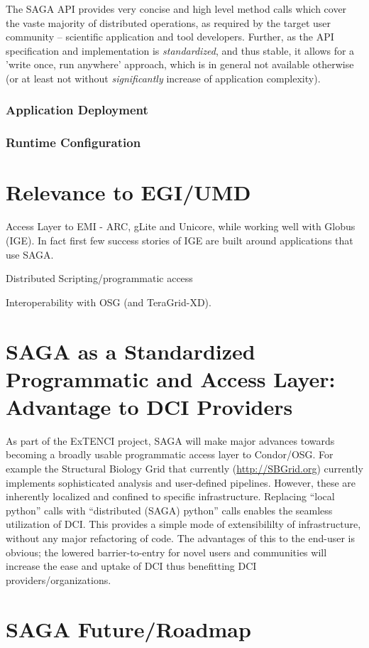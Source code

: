 \documentclass[12pt]{article}
\newcommand{\I}[1]{\textit{#1}}
\begin{document}
  The SAGA API provides very concise and high level method calls which
  cover the vaste majority of distributed operations, as required by
  the target user community -- scientific application and tool
  developers.  Further, as the API specification and implementation is
  \I{standardized}, and thus stable, it allows for a 'write once, run
  anywhere' approach, which is in general not available otherwise (or
  at least not without \I{significantly} increase of application
  complexity).

 \subsubsection*{Application Deployment}

 \subsubsection*{Runtime Configuration}

   


\section{Relevance to EGI/UMD}

Access Layer to EMI - ARC, gLite and Unicore, while working well with
Globus (IGE). In fact first few success stories of IGE are built
around applications that use SAGA.

Distributed Scripting/programmatic access

Interoperability with OSG (and TeraGrid-XD).

\section{SAGA as a Standardized Programmatic and Access Layer:
  Advantage to DCI Providers}

As part of the ExTENCI project, SAGA will make major advances towards
becoming a broadly usable programmatic access layer to Condor/OSG.
For example the Structural Biology Grid that currently
(\url{http://SBGrid.org}) currently implements sophisticated analysis
and user-defined pipelines. However, these are inherently localized
and confined to specific infrastructure.  Replacing ``local python''
calls with ``distributed (SAGA) python'' calls enables the seamless
utilization of DCI. This provides a simple mode of extensibililty of
infrastructure, without any major refactoring of code. The advantages
of this to the end-user is obvious; the lowered barrier-to-entry for
novel users and communities will increase the ease and uptake of DCI
thus benefitting DCI providers/organizations.

\section{SAGA Future/Roadmap}



\end{document}
